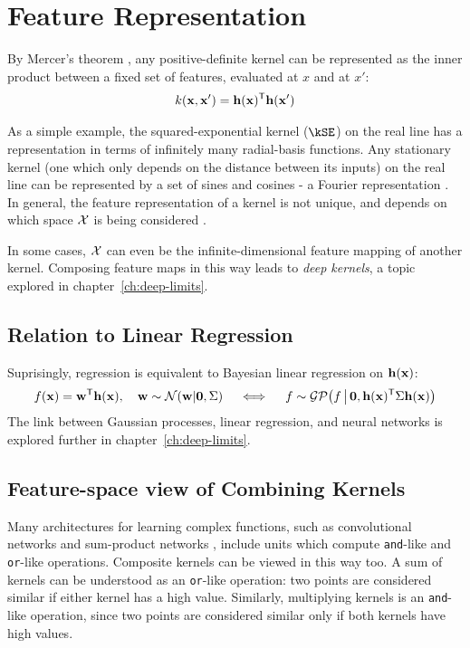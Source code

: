 \section{Feature Representation}
%
By Mercer's theorem \citep{mercer1909functions},
any positive-definite kernel can be represented as the inner product between a fixed set of features, evaluated at $x$ and at $x'$:
%
\begin{align}
k({\bf{x}}, {\bf{x}}') = {\bf{h}}({\bf{x}})^{\mathsf{T}} {\bf{h}}({\bf{x}}')
\end{align}

As a simple example, the squared-exponential kernel ($\kSE$) on the real line has a representation in terms of infinitely many radial-basis functions.
Any stationary kernel (one which only depends on the distance between its inputs) on the real line can be represented by a set of sines and cosines - a Fourier representation \citep{bochner1959lectures}.
In general, the feature representation of a kernel is not unique, and depends on which space $\mathcal{X}$ is being considered \citep{minh2006mercer}.

In some cases, $\mathcal{X}$ can even be the infinite-dimensional feature mapping of another kernel.  Composing feature maps in this way leads to \emph{deep kernels}, a topic explored in chapter~\ref{ch:deep-limits}.



\subsection{Relation to Linear Regression}

Suprisingly, \gp{} regression is equivalent to Bayesian linear regression on ${\bf{h}}({\bf{x}})$:
%
\begin{align}
f({\bf{x}}) = {\bf{w}}^{\mathsf{T}} {\bf{h}}({\bf{x}}), \quad {\bf{w}} \sim \mathcal{N}\!\left({\bf{w}} \middle| {\bf{0}},\Sigma\right) \quad
\iff
\quad f \sim \mathcal{GP}\!\left(f \, \middle| \, {\bf{0}}, {\bf{h}}({\bf{x}}) ^{\mathsf{T}} \Sigma {\bf{h}}({\bf{x}}) \right)
\end{align}
%
The link between Gaussian processes, linear regression, and neural networks is explored further in chapter~\ref{ch:deep-limits}.


\subsection{Feature-space view of Combining Kernels}

\def\feata{\va}
\def\featb{\vb}

Many architectures for learning complex functions, such as convolutional networks \cite{lecun1989backpropagation} and sum-product networks \cite{poon2011sum}, include units which compute \texttt{and}-like and \texttt{or}-like operations.
Composite kernels can be viewed in this way too.
A sum of kernels can be understood as an \texttt{or}-like operation: two points are considered similar if either kernel has a high value.
Similarly, multiplying kernels is an \texttt{and}-like operation, since two points are considered similar only if both kernels have high values.



